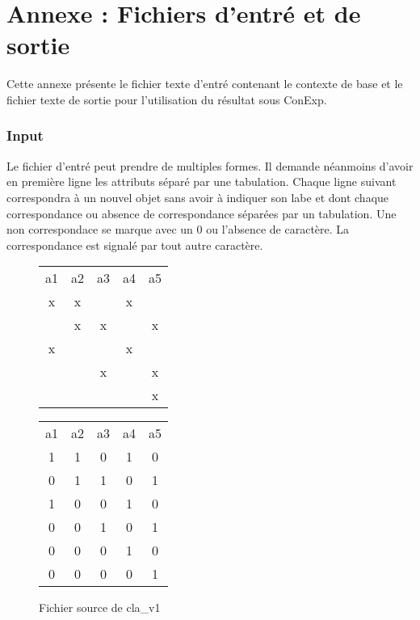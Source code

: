 \chapter{Annexe : Fichiers d'entré et de sortie}

\makeatletter
\renewcommand{\thesection}{\@arabic\c@section}
\makeatother

\setcounter{section}{0}

Cette annexe présente le fichier texte d'entré contenant le contexte de base et le fichier texte de sortie pour l'utilisation du résultat sous ConExp.

\subsection*{Input}

Le fichier d'entré peut prendre de multiples formes. Il demande néanmoins d'avoir en première ligne les attributs séparé par une tabulation. Chaque ligne suivant correspondra à un nouvel objet sans avoir à indiquer son labe et dont chaque correspondance ou absence de correspondance séparées par un tabulation. Une non correspondace se marque avec un \guillemotleft{} 0 \guillemotright{} ou l'absence de caractère. La correspondance est signalé par tout autre caractère.

\begin{figure}[H]
	\begin{minipage}[c]{0.5\textwidth}
	\begin{center}
		\begin{tabular}{ c c c c c }
			a1 & a2 & a3 & a4 & a5 \\
			x & x & & x & \\
			 & x & x & & x\\
			x & & & x & \\
			 & & x & & x \\
			 & & & & x \\
		\end{tabular}
	\end{center}
	\end{minipage}
	\begin{minipage}[c]{0.5\textwidth}
	\begin{center}
		\begin{tabular}{ c c c c c }
			a1 & a2 & a3 & a4 & a5 \\
			1 & 1 & 0 & 1 & 0 \\
			0 & 1 & 1 & 0 & 1 \\
			1 & 0 & 0 & 1 & 0 \\
			0 & 0 & 1 & 0 & 1 \\
			0 & 0 & 0 & 1 & 0 \\
			0 & 0 & 0 & 0 & 1 \\
		\end{tabular}
	\end{center}
	\end{minipage}
	\caption{Fichier source de cla\_v1}
\end{figure}

